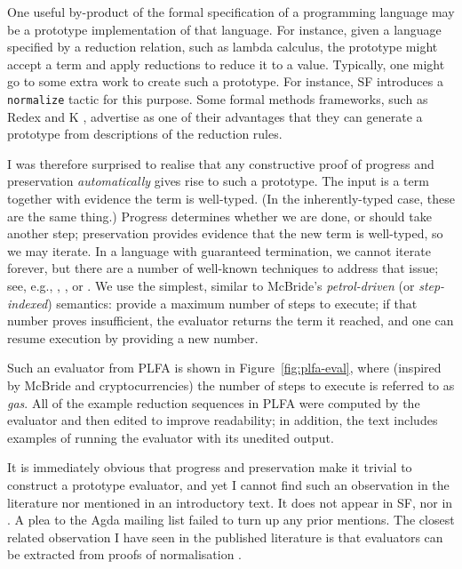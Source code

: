 \documentclass[runningheads]{llncs}
\begin{document}
One useful by-product of the formal specification of a programming
language may be a prototype implementation of that language.  For
instance, given a language specified by a reduction relation, such
as lambda calculus, the prototype might accept a term and apply reductions
to reduce it to a value.  Typically, one might go to some extra work to
create such a prototype.  For instance, SF introduces a \texttt{normalize}
tactic for this purpose.  Some formal methods frameworks, such as
Redex \citep{Felleisen-et-al-2009} and K \citep{Rosu-Serbanuta-2010},
advertise as one of their advantages that they can generate
a prototype from descriptions of the reduction rules.

I was therefore surprised to realise that any constructive proof of
progress and preservation \emph{automatically} gives rise to such a
prototype.  The input is a term together with evidence the term is
well-typed.  (In the inherently-typed case, these are the same thing.)
Progress determines whether we are done, or should take another step;
preservation provides evidence that the new term is well-typed, so we
may iterate. In a language with guaranteed termination, we cannot
iterate forever, but there are a number of well-known techniques to
address that issue; see, e.g., \citet{Bove-and-Capretta-2001},
\citet{Capretta-2005}, or \citet{McBride-2015}.
We use the simplest, similar to McBride's \emph{petrol-driven} (or
\emph{step-indexed}) semantics: provide a maximum number of steps to
execute; if that number proves insufficient, the evaluator returns the
term it reached, and one can resume execution by providing a new
number.

Such an evaluator from PLFA is shown in Figure~\ref{fig:plfa-eval},
where (inspired by McBride and cryptocurrencies) the number of steps
to execute is referred to as \emph{gas}. All of the example reduction
sequences in PLFA were computed by the evaluator and then edited to
improve readability; in addition, the text includes examples of
running the evaluator with its unedited output.

It is immediately obvious that progress and preservation make it
trivial to construct a prototype evaluator, and yet I cannot find such
an observation in the literature nor mentioned in an introductory
text.  It does not appear in SF, nor in \citet{Harper-2016}.  A plea
to the Agda mailing list failed to turn up any prior mentions.
The closest related observation I have seen in the published
literature is that evaluators can be extracted from proofs of
normalisation \citep{Berger-1993,Dagand-and-Scherer-2015}.
\end{document}
